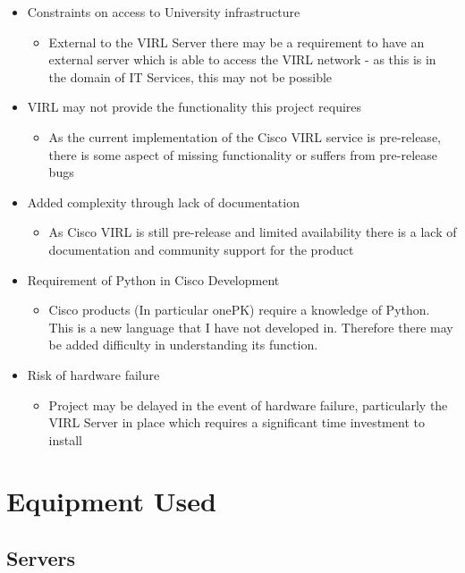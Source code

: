 \documentclass[11pt]{report}
\begin{document}
\begin{itemize}
  \item{Constraints on access to University infrastructure}
  \begin{itemize}
    \item{External to the VIRL Server there may be a requirement to have an external server which is able to access the VIRL network - as this is in the domain of IT Services, this may not be possible}
  \end{itemize}
  \item{VIRL may not provide the functionality this project requires}
  \begin{itemize}
    \item{As the current implementation of the Cisco VIRL service is pre-release, there is some aspect of missing functionality or suffers from pre-release bugs}
  \end{itemize}
  \item{Added complexity through lack of documentation}
  \begin{itemize}
    \item{As Cisco VIRL is still pre-release and limited availability there is a lack of documentation and community support for the product}
  \end{itemize}
  \item{Requirement of Python in Cisco Development}
  \begin{itemize}
    \item{Cisco products (In particular onePK) require a knowledge of Python. This is a new language that I have not developed in. Therefore there may be added difficulty in understanding its function.}
  \end{itemize}
  \item{Risk of hardware failure}
  \begin{itemize}
    \item{Project may be delayed in the event of hardware failure, particularly the VIRL Server in place which requires a significant time investment to install}
  \end{itemize}
\end{itemize}

\section{Equipment Used}


\subsection{Servers}
\end{document}
